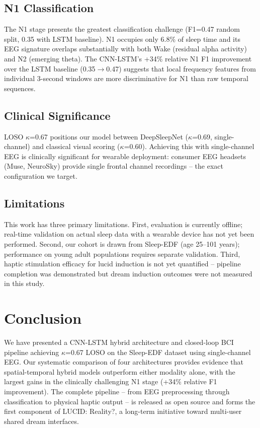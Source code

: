 \documentclass[journal]{IEEEtran}
\begin{document}
\subsection{N1 Classification}

The N1 stage presents the greatest classification
challenge (F1=0.47 random split, 0.35 with LSTM
baseline).
N1 occupies only 6.8\% of sleep time and its EEG
signature overlaps substantially with both Wake
(residual alpha activity) and N2 (emerging theta).
The CNN-LSTM's +34\% relative N1 F1 improvement over
the LSTM baseline (0.35$\rightarrow$0.47) suggests
that local frequency features from individual
3-second windows are more discriminative for N1
than raw temporal sequences.

\subsection{Clinical Significance}

LOSO $\kappa$=0.67 positions our model between
DeepSleepNet ($\kappa$=0.69, single-channel) and
classical visual scoring ($\kappa$=0.60).
Achieving this with single-channel EEG is clinically
significant for wearable deployment: consumer EEG
headsets (Muse, NeuroSky) provide single frontal
channel recordings -- the exact configuration
we target.

\subsection{Limitations}

This work has three primary limitations.
First, evaluation is currently offline; real-time
validation on actual sleep data with a wearable
device has not yet been performed.
Second, our cohort is drawn from Sleep-EDF
(age 25--101 years); performance on young adult
populations requires separate validation.
Third, haptic stimulation efficacy for lucid
induction is not yet quantified -- pipeline
completion was demonstrated but dream induction
outcomes were not measured in this study.

\section{Conclusion}
\label{sec:conclusion}

We have presented a CNN-LSTM hybrid architecture
and closed-loop BCI pipeline achieving $\kappa$=0.67
LOSO on the Sleep-EDF dataset using single-channel
EEG.
Our systematic comparison of four architectures
provides evidence that spatial-temporal hybrid
models outperform either modality alone, with the
largest gains in the clinically challenging N1
stage (+34\% relative F1 improvement).
The complete pipeline -- from EEG preprocessing
through classification to physical haptic output
-- is released as open source and forms the first
component of LUCID: Reality?, a long-term initiative
toward multi-user shared dream interfaces.
\end{document}
